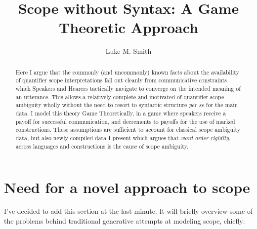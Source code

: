\documentclass{article}
\title{Scope without Syntax: A Game Theoretic Approach}
\author{Luke M. Smith}
\begin{document}
\maketitle

\begin{abstract}
	Here I argue that the commonly (and uncommonly) known facts about the availability of quantifier scope interpretations fall out cleanly from communicative constraints which Speakers and Hearers tactically navigate to converge on the intended meaning of an utterance.
	This allows a relatively complete and motivated of quantifier scope ambiguity wholly without the need to resort to syntactic structure \textit{per se} for the main data.
	I model this theory Game Theoretically, in a game where speakers receive a payoff for successful communication, and decrements to payoffs for the use of marked constructions.
	These assumptions are sufficient to account for classical scope ambiguity data, but also newly compiled data I present which argues that \emph{word order rigidity}, across languages and constructions is the cause of scope ambiguity.
\end{abstract}




\section{Need for a novel approach to scope}

I've decided to add this section at the last minute. It will briefly overview some of the problems behind traditional generative attempts at modeling scope, chiefly:
\end{document}
